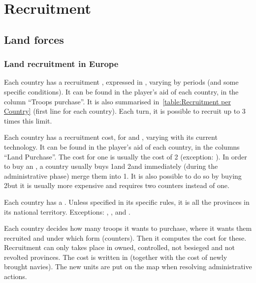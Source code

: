 



\section{Recruitment}\label{chLogistic:Recruitment}



\subsection{Land forces}


\subsubsection{Land recruitment in Europe}
\aparag[Limit]
\bparag Each country has a recruitment , expressed in \LD,
varying by periods (and some specific conditions).
\bparag It can be found in the player's aid of each country, in the column
``Troops purchase''.
\bparag It is also summarised in~\ref{table:Recruitment per Country} (first
line for each country).
\bparag Each turn, it is possible to recruit up to 3 times this limit.

\aparag[Costs]
\bparag Each country has a recruitment cost, for \LD and \ARMY\Facemoins,
varying with its current technology.
\bparag It can be found in the player's aid of each country, in the columns
``Land Purchase''.
\bparag The cost for one \ARMY\Facemoins is usually the cost of 2\LD
(exception: \RUS).
\bparag In order to buy an \ARMY\Faceplus, a country usually buys
1\ARMY\Facemoins and 2\LD and immediately (during the administrative phase)
merge them into 1\ARMY\Faceplus. It is also possible to do so by buying
2\ARMY\Facemoins but it is usually more expensive and requires two \ARMY
counters instead of one.

 Each country has a . Unless
specified in its specific rules, it is all the provinces in its national
territory.
\bparag Exceptions: \HIS, \TUR, \RUS and \SUE.

\aparag[Recruitment.] Each country decides how many troops it wants to
purchase, where it wants them recruited and under which form (counters). Then
it computes the cost for these.
\bparag Recruitment can only takes place in owned, controlled, not besieged
and not revolted provinces.
\bparag The cost is written in  (together with the
cost of newly brought navies).
\bparag The new units are put on the map when resolving administrative
actions.

